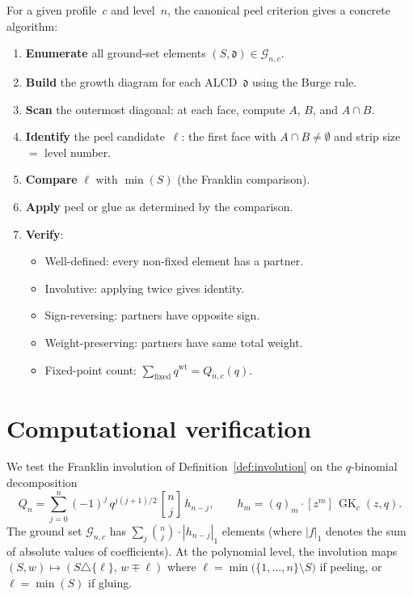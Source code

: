 \documentclass[11pt]{article}
\newcommand{\GK}{\operatorname{GK}}
\newcommand{\qbin}[2]{\genfrac{[}{]}{0pt}{}{#1}{#2}}
\DeclareMathOperator{\wt}{wt}
\theoremstyle{plain}
\theoremstyle{definition}
\begin{document}
For a given profile~$c$ and level~$n$, the canonical peel
criterion gives a concrete algorithm:

\begin{enumerate}
  \item \textbf{Enumerate} all ground-set elements
    $(S, \mathfrak{d}) \in \mathcal{G}_{n,c}$.

  \item \textbf{Build} the growth diagram for each
    ALCD~$\mathfrak{d}$ using the Burge rule.

  \item \textbf{Scan} the outermost diagonal: at each
    face, compute $A$, $B$, and $A \cap B$.

  \item \textbf{Identify} the peel candidate~$\ell$:
    the first face with $A \cap B \neq \emptyset$ and
    strip size $= $ level number.

  \item \textbf{Compare} $\ell$ with $\min(S)$ (the
    Franklin comparison).

  \item \textbf{Apply} peel or glue as determined by
    the comparison.

  \item \textbf{Verify}:
    \begin{itemize}
      \item Well-defined: every non-fixed element has
        a partner.
      \item Involutive: applying twice gives identity.
      \item Sign-reversing: partners have opposite sign.
      \item Weight-preserving: partners have same total
        weight.
      \item Fixed-point count:
        $\sum_{\text{fixed}} q^{\wt} = Q_{n,c}(q)$.
    \end{itemize}
\end{enumerate}


\section{Computational verification}
\label{sec:computation}

We test the Franklin involution of
Definition~\ref{def:involution} on the $q$-binomial
decomposition
\begin{equation}\label{eq:q-binom}
  Q_n = \sum_{j=0}^{n} (-1)^j\, q^{j(j+1)/2}\,
  \qbin{n}{j}\, h_{n-j},
  \qquad
  h_m = (q)_m \cdot [z^m]\,\GK_c(z,q).
\end{equation}
The ground set $\mathcal{G}_{n,c}$ has
$\sum_{j} \binom{n}{j} \cdot |h_{n-j}|_1$ elements (where
$|f|_1$ denotes the sum of absolute values of coefficients).
At the polynomial level, the involution maps
$(S, w) \mapsto (S \triangle \{\ell\},\, w \mp \ell)$
where $\ell = \min\bigl(\{1, \ldots, n\} \setminus S\bigr)$
if peeling, or $\ell = \min(S)$ if gluing.
\end{document}
